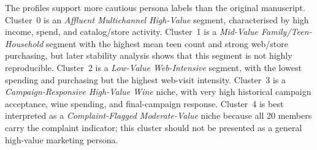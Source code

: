 \documentclass[10pt]{article}
\begin{document}
\begin{table}[!ht]
\centering
\caption{Key mean characteristics of the locked outcome-held-out five-cluster solution.}
\label{tab:persona_profiles}
\end{table}

The profiles support more cautious persona labels than the original manuscript. Cluster~0 is an \emph{Affluent Multichannel High-Value} segment, characterised by high income, spend, and catalog/store activity. Cluster~1 is a \emph{Mid-Value Family/Teen-Household} segment with the highest mean teen count and strong web/store purchasing, but later stability analysis shows that this segment is not highly reproducible. Cluster~2 is a \emph{Low-Value Web-Intensive} segment, with the lowest spending and purchasing but the highest web-visit intensity. Cluster~3 is a \emph{Campaign-Responsive High-Value Wine} niche, with very high historical campaign acceptance, wine spending, and final-campaign response. Cluster~4 is best interpreted as a \emph{Complaint-Flagged Moderate-Value} niche because all 20 members carry the complaint indicator; this cluster should not be presented as a general high-value marketing persona.
\end{document}
